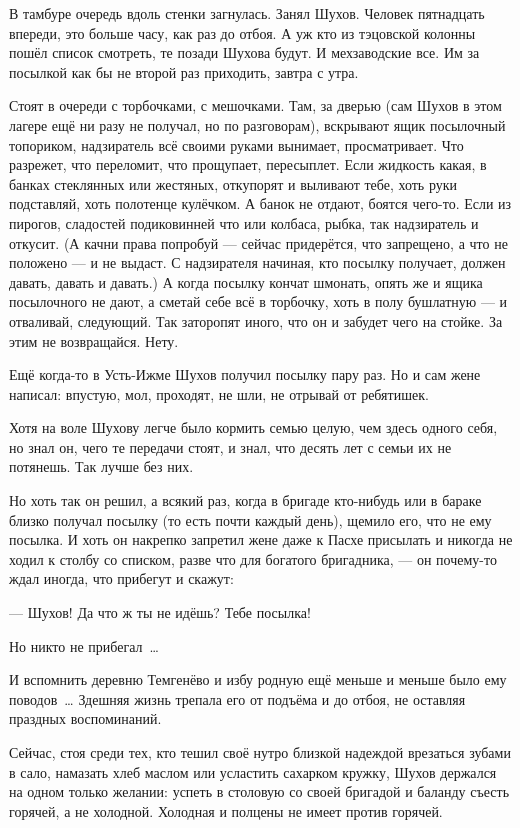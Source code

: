 В тамбуре очередь вдоль стенки загнулась. Занял Шухов. Человек пятнадцать впереди, это 
больше часу, как раз до отбоя. А уж кто из тэцовской колонны пошёл список смотреть, те позади 
Шухова будут. И мехзаводские все. Им за посылкой как бы не второй раз приходить, завтра с утра.

Стоят в очереди с торбочками, с мешочками. Там, за дверью (сам Шухов в этом лагере ещё ни разу 
не получал, но по разговорам), вскрывают ящик посылочный топориком, надзиратель всё своими 
руками вынимает, просматривает. Что разрежет, что переломит, что прощупает, пересыплет. Если 
жидкость какая, в банках стеклянных или жестяных, откупорят и выливают тебе, хоть руки 
подставляй, хоть полотенце кулёчком. А банок не отдают, боятся чего-то. Если из пирогов, 
сладостей подиковинней что или колбаса, рыбка, так надзиратель и откусит. (А качни права 
попробуй --- сейчас придерётся, что запрещено, а что не положено --- и не выдаст. С надзирателя 
начиная, кто посылку получает, должен давать, давать и давать.) А когда посылку кончат 
шмонать, опять же и ящика посылочного не дают, а сметай себе всё в торбочку, хоть в полу 
бушлатную --- и отваливай, следующий. Так заторопят иного, что он и забудет чего на стойке. За 
этим не возвращайся. Нету.

Ещё когда-то в Усть-Ижме Шухов получил посылку пару раз. Но и сам жене написал: впустую, мол, 
проходят, не шли, не отрывай от ребятишек.

Хотя на воле Шухову легче было кормить семью целую, чем здесь одного себя, но знал он, чего те 
передачи стоят, и знал, что десять лет с семьи их не потянешь. Так лучше без них.

Но хоть так он решил, а всякий раз, когда в бригаде кто-нибудь или в бараке близко получал 
посылку (то есть почти каждый день), щемило его, что не ему посылка. И хоть он накрепко 
запретил жене даже к Пасхе присылать и никогда не ходил к столбу со списком, разве что для 
богатого бригадника, --- он почему-то ждал иногда, что прибегут и скажут:

--- Шухов! Да что ж ты не идёшь? Тебе посылка!

Но никто не прибегал~\dots{}

И вспомнить деревню Темгенёво и избу родную ещё меньше и меньше было ему поводов~\dots{} 
Здешняя жизнь трепала его от подъёма и до отбоя, не оставляя праздных воспоминаний.

Сейчас, стоя среди тех, кто тешил своё нутро близкой надеждой врезаться зубами в сало, 
намазать хлеб маслом или усластить сахарком кружку, Шухов держался на одном только желании: 
успеть в столовую со своей бригадой и баланду съесть горячей, а не холодной. Холодная и 
полцены не имеет против горячей.

